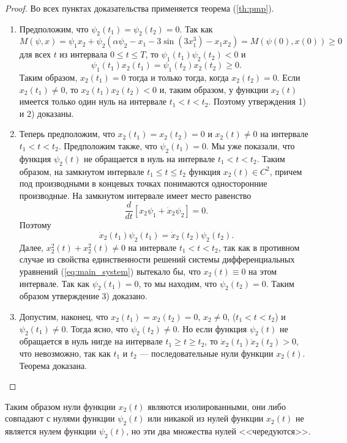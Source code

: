 \begin{proof}
        Во всех пунктах доказательства применяется теорема (\ref{th:pmp}).
        \begin{enumerate}
                \item Предположим, что $\psi_2(t_1) = \psi_2(t_2) = 0$. Так как
                $$
                        M(\psi, x) = \psi_1x_2 + \psi_2(\alpha\psi_2-x_1-3\sin(3x_1^3)-x_1x_2) = M(\psi(0), x(0)) \geqslant 0
                $$
                для всех $t$ из интервала $0\leqslant t \leqslant T$, то $\psi_1(t_1)\psi_2(t_2) < 0$ и
                $$
                \psi_1(t_1)x_2(t_1) = \psi_1(t_2)x_2(t_2) \geqslant 0.
                $$
                Таким образом, $x_2(t_1) = 0$ тогда и только тогда, когда $x_2(t_2) = 0$. Если $x_2(t_1) \neq 0$, то $x_2(t_1)x_2(t_2) < 0$ и, таким образом, у функции $x_2(t)$ имеется только один нуль на интервале $t_1<t<t_2$. Поэтому утверждения 1) и 2) доказаны.

                \item Теперь предположим, что $x_2(t_1) = x_2(t_2) = 0$ и $x_2(t) \neq 0$ на интервале $t_1 < t < t_2$. Предположим также, что $\psi_2(t_1) = 0$. Мы уже показали, что функция $\psi_2(t)$ не обращается в нуль на интервале $t_1 < t < t_2$. Таким образом, на замкнутом интервале $t_1 \leqslant t \leqslant t_2$ функция $x_2(t) \in C^2$, причем под производными в концевых точках понимаются односторонние производные. На замкнутом интервале имеет место равенство
                $$
                        \frac{d}{dt}[x_2\psi_1+\dot x_2 \psi_2] = 0.
                $$
                Поэтому
                $$
                        \dot x_2(t_1)\psi_2(t_1) = \dot x_2(t_2)\psi_2(t_2).
                $$
                Далее, $x_2^2(t) + x_2^2(t) \neq 0$ на интервале $t_1 < t < t_2$, так как в противном случае из свойства единственности решений системы дифференциальных уравнений (\ref{eq:main_system}) вытекало бы, что $x_2(t) \equiv 0$ на этом интервале. Так как $\psi_2(t_1) = 0$, то мы находим, что $\psi_2(t_2) = 0$. Таким образом утверждение 3) доказано.

                \item Допустим, наконец, что $x_2(t_1) = x_2(t_2) = 0$, $x_2 \neq 0$, ($t_1 < t < t_2$) и $\psi_2(t_1) \neq 0$. Тогда ясно, что $\psi_2(t_2) \neq 0$. Но если функция $\psi_2(t)$ не обращается в нуль нигде на интервале $t_1 \geqslant t \geqslant t_2$, то $\dot x_2(t_1)\dot x_2(t_2) > 0$, что невозможно, так как $t_1$ и $t_2$ --- последовательные нули функции $x_2(t)$. Теорема доказана. 
        \end{enumerate}
\end{proof}
\begin{remark}
        Таким образом нули функции $x_2(t)$ являются изолированными, они либо совпадают с нулями функции $\psi_2(t)$ или никакой из нулей функции $x_2(t)$ не является нулем функции $\psi_2(t)$, но эти два множества нулей <<чередуются>>.
\end{remark}

